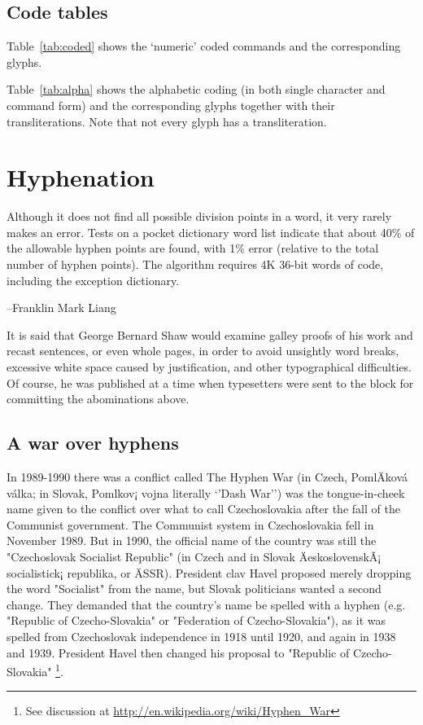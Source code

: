 \section{Code tables}

Table~\ref{tab:coded} 
shows the `numeric' coded commands and the corresponding
glyphs. 

Table~\ref{tab:alpha} 
shows the alphabetic coding (in both single
character and command form) and the corresponding glyphs together with their
transliterations. Note that not every glyph has a transliteration.

\begin{comment}

\begin{center}
  \Large\cartouche{\pmglyph{K:l-i-o-p-a-d:r-a}}
\end{center}
\end{comment}

\chapter{Hyphenation}
\label{ch:hyphenation}

\epigraph{Although it does not find all possible division points in a word, it very rarely makes an error. Tests on a pocket dictionary word list indicate that about 40\% of the allowable hyphen points are found, with 1\% error (relative to the total number of hyphen points). The algorithm requires 4K 36-bit words of code, including the exception dictionary.}{--Franklin Mark Liang \citep{liang83}}

\label{ch:hyphenation} 
It is said that George Bernard Shaw would examine galley proofs of his work and recast sentences, or even whole pages, in order to avoid unsightly word breaks, excessive white space caused by justification, and other typographical difficulties. Of course, he was published at a time when typesetters were sent to the block for committing the abominations above.\cite{Major1991} 

\section*{A war over hyphens}
In 1989-1990 there was a conflict called The Hyphen War (in Czech, PomlÄkov\'a v\' alka; in Slovak, Pomlkov¡ vojna literally `'Dash War'') was the tongue-in-cheek name given to the conflict over what to call Czechoslovakia after the fall of the Communist government. The Communist system in Czechoslovakia fell in November 1989. But in 1990, the official name of the country was still the "Czechoslovak Socialist Republic" (in Czech and in Slovak ÄeskoslovenskÃ¡ socialistick¡ republika, or ÄSSR). President clav Havel proposed merely dropping the word "Socialist" from the name, but Slovak politicians wanted a second change. They demanded that the country's name be spelled with a hyphen (e.g. "Republic of Czecho-Slovakia" or "Federation of Czecho-Slovakia"), as it was spelled from Czechoslovak independence in 1918 until 1920, and again in 1938 and 1939. President Havel then changed his proposal to "Republic of Czecho-Slovakia" \footnote{See discussion at \url{http://en.wikipedia.org/wiki/Hyphen_War}}. 

